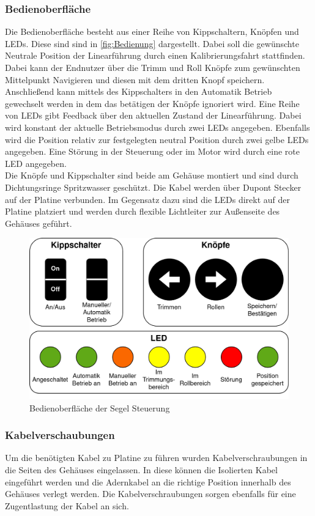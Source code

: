 \subsubsection{Bedienoberfläche}
\noindent Die Bedienoberfläche besteht aus einer Reihe von Kippschaltern, Knöpfen und \ac{LED}s. Diese sind sind in \autoref{fig:Bedienung} dargestellt. Dabei soll die gewünschte Neutrale Position der Linearführung durch einen Kalibrierungsfahrt stattfinden. Dabei kann der Endnutzer über die Trimm und Roll Knöpfe zum gewünschten Mittelpunkt Navigieren und diesen mit dem dritten Knopf speichern. Anschließend kann mittels des Kippschalters in den Automatik Betrieb gewechselt werden in dem das betätigen der Knöpfe ignoriert wird.
Eine Reihe von LEDs gibt Feedback über den aktuellen Zustand der Linearführung. Dabei wird konstant der aktuelle Betriebsmodus durch zwei LEDs angegeben. Ebenfalls wird die Position relativ zur festgelegten neutral Position durch zwei gelbe LEDs angegeben. Eine Störung in der Steuerung oder im Motor wird durch eine rote LED angegeben.\\
Die Knöpfe und Kippschalter sind beide am Gehäuse montiert und sind durch Dichtungsringe Spritzwasser geschützt. Die Kabel werden über Dupont Stecker auf der Platine verbunden. Im Gegensatz dazu sind die LEDs direkt auf der Platine platziert und werden durch flexible Lichtleiter zur Außenseite des Gehäuses geführt.
\begin{figure}[H]
	\centering
	\includegraphics[width=1.0\textwidth]{images/Hardware/Bedienung.drawio.png}
	\caption{Bedienoberfläche der Segel Steuerung}
	\label{fig:Bedienung}
\end{figure}
\subsubsection{Kabelverschaubungen}
Um die benötigten Kabel zu Platine zu führen wurden Kabelverschraubungen in die Seiten des Gehäuses eingelassen. In diese können die Isolierten Kabel eingeführt werden und die Adernkabel an die richtige Position innerhalb des Gehäuses verlegt werden. Die Kabelverschraubungen sorgen ebenfalls für eine Zugentlastung der Kabel an sich.
